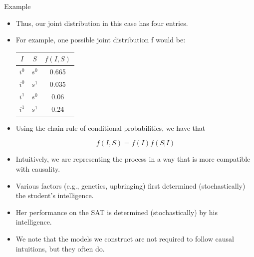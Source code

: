 \documentclass[handout]{beamer}
\begin{document}
\begin{frame}{Example}
\scriptsize{
\begin{itemize}

\item Thus, our joint distribution in this case has four entries. 
\item For example, one possible joint distribution f would be:

\begin{table}
\centering
  \begin{tabular}{cc|c} \hline
$I$ & $S$ & $f(I,S)$  \\ \hline
$i^0$ & $s^0$ & 0.665 \\
$i^0$ & $s^1$ & 0.035 \\
$i^1$ & $s^0$ & 0.06 \\
$i^1$ & $s^1$ & 0.24 
\end{tabular} 
\end{table}

\item Using the chain rule of conditional probabilities, we have that

\begin{displaymath}
 f(I,S) = f(I)f(S|I)
\end{displaymath}
\item Intuitively, we are representing the process in a way that is more compatible with causality.

\item Various factors (e.g., genetics, upbringing) first determined (stochastically) the student's intelligence.
\item Her performance on the SAT is determined (stochastically) by his intelligence. 
\item We note that the models we construct are not required to follow causal intuitions, but they often do.



\end{itemize}



} 

\end{frame}
\end{document}
